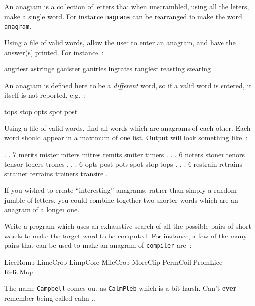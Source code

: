
An anagram is a collection of letters that
when unscrambled, using all the leters, make
a single word. For instance \verb^magrana^ can
be rearranged to make the word \verb^anagram^.

\begin{exercise}
Using a file of valid words, allow the user
to enter an anagram, and have the answer(s)
printed. For instance~:
\begin{terminaloutput}
angriest
astringe
ganister
gantries
ingrates
rangiest
reasting
stearing
\end{terminaloutput}

An anagram is defined here to be a {\em different} word, so if a valid word is 
entered, it itself is not reported, e.g.~:
\begin{terminaloutput}
tops
stop
opts
spot
post
\end{terminaloutput}

\end{exercise}

\begin{exercise}
Using a file of valid words, find all
words which are anagrams of each other.
Each word should appear in a maximum of one list.
Output will look something like~:
\begin{terminaloutput}
.
.
7 merits mister miters mitres remits smiter timers
.
.
.
6 noters stoner tenors tensor toners trones
.
.
.
6 opts post pots spot stop tops
.
.
.
6 restrain retrains strainer terrains trainers transire
.
\end{terminaloutput}
\end{exercise}

If you wished to create ``interesting'' anagrams, rather than simply
a random jumble of letters, you could combine together two
shorter words which are an anagram of a longer one.

\begin{exercise}
Write a program which uses an exhaustive
search of all the possible pairs of short words to make the target word
to be computed.
For instance, a few of the many pairs that
can be used to make an anagram of \verb^compiler^ are~:
\begin{terminaloutput}
LiceRomp
LimeCrop
LimpCore
MileCrop
MoreClip
PermCoil
PromLice
RelicMop
\end{terminaloutput}
\end{exercise}

The name \verb^Campbell^ comes out as \verb^CalmPleb^ which is a
bit harsh. Can't {\bf ever} remember being called calm ... 
